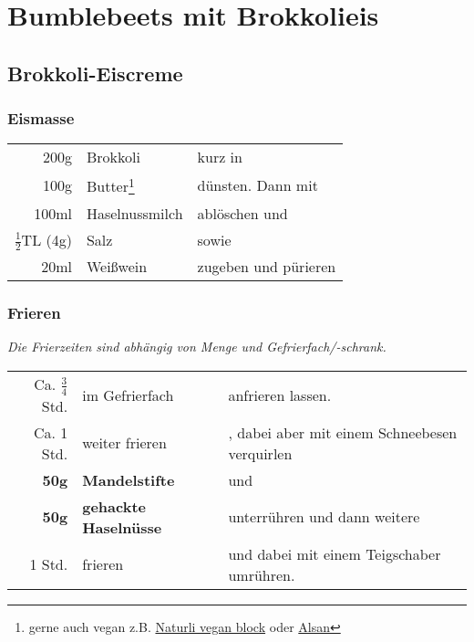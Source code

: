\section{Bumblebeets mit Brokkolieis}
\subsection*{Brokkoli-Eiscreme}\label{subsec:broc-icecream}
\subsubsection*{Eismasse}
\begin{longtable}{rlL{15,8cm}}
    200g                    &   Brokkoli        &   kurz in    \\
    100g                    &   Butter\footnote{gerne auch vegan z.B. \href{https://www.bio123.de/produkt/naturli/naturli-organic-vegan-block-200g}{Naturli vegan block}
									        oder \href{https://www.alsan.de/alsan-bio/}{Alsan}}
                                                &   dünsten.
                                                    Dann mit    \\
    100ml                   &   Haselnussmilch  &   ablöschen und   \\
    $\frac{1}{2}$TL (4g)    &   Salz            &   sowie \\
    20ml                    &   Weißwein        &   zugeben und pürieren    \\
\end{longtable}
\subsubsection*{Frieren}
\emph{Die Frierzeiten sind abhängig von Menge und Gefrierfach/-schrank.}
\begin{longtable}{rlL{14,6cm}}
    Ca. $\frac{3}{4}$ Std.  &   im Gefrierfach                  &   anfrieren lassen.   \\
    Ca. 1 Std.              &   weiter frieren                  &   , dabei aber  mit einem Schneebesen verquirlen \\
    \textbf{50g}            &   \textbf{Mandelstifte}           &   und \\
    \textbf{50g}            &   \textbf{gehackte Haselnüsse}    &   unterrühren und dann weitere    \\
    1 Std.                  &   frieren                         &   und dabei  mit einem Teigschaber umrühren. \\
\end{longtable}

